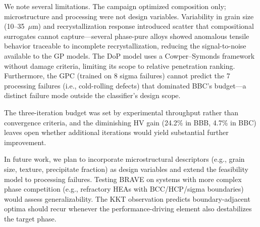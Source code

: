 We note several limitations. The campaign optimized composition only; microstructure and processing were not design variables. Variability in grain size (10--35~$\mu$m) and recrystallization response introduced scatter that compositional surrogates cannot capture---several phase-pure alloys showed anomalous tensile behavior traceable to incomplete recrystallization, reducing the signal-to-noise available to the GP models. The DoP model uses a Cowper--Symonds framework without damage criteria, limiting its scope to relative penetration ranking. Furthermore, the GPC (trained on 8 sigma failures) cannot predict the 7 processing failures (i.e., cold-rolling defects) that dominated BBC's budget---a distinct failure mode outside the classifier's design scope.

The three-iteration budget was set by experimental throughput rather than convergence criteria, and the diminishing HV gain (24.2\% in BBB, 4.7\% in BBC) leaves open whether additional iterations would yield substantial further improvement.

In future work, we plan to incorporate microstructural descriptors (e.g., grain size, texture, precipitate fraction) as design variables and extend the feasibility model to processing failures. Testing BRAVE on systems with more complex phase competition (e.g., refractory HEAs with BCC/HCP/sigma boundaries) would assess generalizability. The KKT observation predicts boundary-adjacent optima should recur whenever the performance-driving element also destabilizes the target phase.
